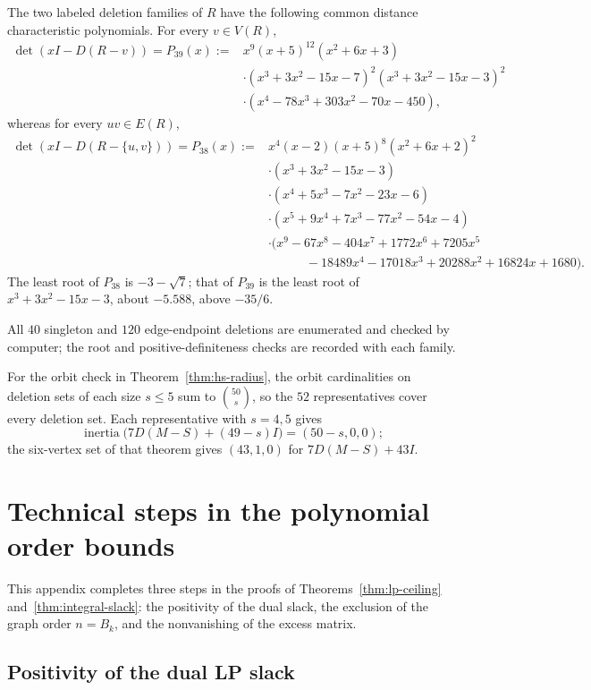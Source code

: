 \documentclass[a4paper,10pt,reqno]{amsart}
\theoremstyle{plain}
\theoremstyle{definition}
\theoremstyle{remark}
\begin{document}
The two labeled deletion families of \(R\) have the following common
distance characteristic polynomials.
For every
\(v\in V(R)\),
\begin{align*}
\det(xI-D(R-v))=P_{39}(x):={}&x^9(x+5)^{12}(x^2+6x+3)\\
&\cdot(x^3+3x^2-15x-7)^2(x^3+3x^2-15x-3)^2\\
&\cdot(x^4-78x^3+303x^2-70x-450),
\end{align*}
whereas for every \(uv\in E(R)\),
\begin{align*}
\det(xI-D(R-\{u,v\}))=P_{38}(x):={}&x^4(x-2)(x+5)^8(x^2+6x+2)^2\\
&\cdot(x^3+3x^2-15x-3)\\
&\cdot(x^4+5x^3-7x^2-23x-6)\\
&\cdot(x^5+9x^4+7x^3-77x^2-54x-4)\\
&\cdot(x^9-67x^8-404x^7+1772x^6+7205x^5\\
&\hspace{3em}-18489x^4-17018x^3+20288x^2+16824x+1680).
\end{align*}
The least root of \(P_{38}\) is \(-3-\sqrt7\); that of \(P_{39}\) is the least
root of \(x^3+3x^2-15x-3\), about \(-5.588\), above \(-35/6\).

All \(40\) singleton and \(120\) edge-endpoint deletions are enumerated and checked by computer; the root and
positive-definiteness checks are recorded with each family.

For the orbit check in Theorem~\ref{thm:hs-radius}, the orbit cardinalities
on deletion sets of each size \(s\le5\) sum to \(\binom{50}{s}\), so the
\(52\) representatives cover every deletion set. Each representative with
\(s=4,5\) gives
\[
 \operatorname{inertia}\bigl(7D(M-S)+(49-s)I\bigr)=(50-s,0,0);
\]
the six-vertex set of that theorem gives \((43,1,0)\) for \(7D(M-S)+43I\).

\section{Technical steps in the polynomial order bounds}
\label{app:lp-slack-positivity}

This appendix completes three steps in the proofs of
Theorems~\ref{thm:lp-ceiling} and~\ref{thm:integral-slack}: the positivity
of the dual slack, the exclusion of the graph order \(n=B_k\), and the
nonvanishing of the excess matrix.

\subsection{Positivity of the dual LP slack}
\end{document}
